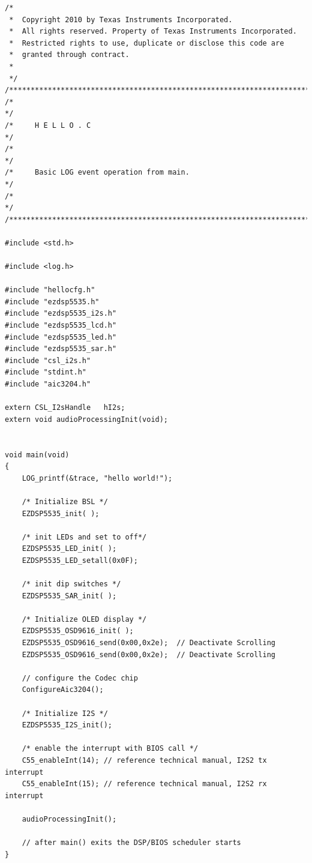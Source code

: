 \documentclass[11pt,pdftex,portrait,letterpaper]{article}
\begin{document}
\begin{lstlisting}[caption={main.c}, label=l:program1]
/*
 *  Copyright 2010 by Texas Instruments Incorporated.
 *  All rights reserved. Property of Texas Instruments Incorporated.
 *  Restricted rights to use, duplicate or disclose this code are
 *  granted through contract.
 *
 */
/***************************************************************************/
/*                                                                         */
/*     H E L L O . C                                                       */
/*                                                                         */
/*     Basic LOG event operation from main.                                */
/*                                                                         */
/***************************************************************************/

#include <std.h>

#include <log.h>

#include "hellocfg.h"
#include "ezdsp5535.h"
#include "ezdsp5535_i2s.h"
#include "ezdsp5535_lcd.h"
#include "ezdsp5535_led.h"
#include "ezdsp5535_sar.h"
#include "csl_i2s.h"
#include "stdint.h"
#include "aic3204.h"

extern CSL_I2sHandle   hI2s;
extern void audioProcessingInit(void);


void main(void)
{
    LOG_printf(&trace, "hello world!");

    /* Initialize BSL */
    EZDSP5535_init( );

    /* init LEDs and set to off*/
    EZDSP5535_LED_init( );
    EZDSP5535_LED_setall(0x0F);

    /* init dip switches */
    EZDSP5535_SAR_init( );

	/* Initialize OLED display */
    EZDSP5535_OSD9616_init( );
    EZDSP5535_OSD9616_send(0x00,0x2e);  // Deactivate Scrolling
    EZDSP5535_OSD9616_send(0x00,0x2e);  // Deactivate Scrolling

    // configure the Codec chip
    ConfigureAic3204();

    /* Initialize I2S */
    EZDSP5535_I2S_init();

    /* enable the interrupt with BIOS call */
    C55_enableInt(14); // reference technical manual, I2S2 tx interrupt
    C55_enableInt(15); // reference technical manual, I2S2 rx interrupt

    audioProcessingInit();

    // after main() exits the DSP/BIOS scheduler starts
}
\end{lstlisting}
\pagebreak
\end{document}
